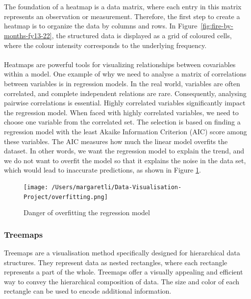 \documentclass{article}\usepackage[]{graphicx}\usepackage[]{xcolor}
\begin{document}
\\  
\\The foundation of a heatmap is a data matrix, where each entry in this matrix represents an observation or measurement. Therefore, the first step to create a heatmap is to organize the data by columns and rows. In Figure~\ref{fig:fire-by-months-fy13-22}, the structured data is displayed as a grid of coloured cells, where the colour intensity corresponds to the underlying frequency.
\\  
\\Heatmaps are powerful tools for visualizing relationships between covariables within a model. One example of why we need to analyse a matrix of correlations between variables is in regression models. In the real world, variables are often correlated, and complete independent relations are rare. Consequently, analysing pairwise correlations is essential. Highly correlated variables significantly impact the regression model. When faced with highly correlated variables, we need to choose one variable from the correlated set. The selection is based on finding a regression model with the least Akaike Information Criterion (AIC) score among these variables. The AIC measures how much the linear model overfits the dataset. In other words, we want the regression model to explain the trend, and we do not want to overfit the model so that it explains the noise in the data set, which would lead to inaccurate predictions, as shown in Figure \ref{fig:noisy}.


\begin{figure}[h]
    \centering
    \texttt{[image: /Users/margaretli/Data-Visualisation-Project/overfitting.png]}
    \caption{Danger of overfitting the regression model}
    \label{fig:noisy}
\end{figure}

\subsubsection{Treemaps}
Treemaps are a visualisation method specifically designed for hierarchical data structures. They represent data as nested rectangles, where each rectangle represents a part of the whole. Treemaps offer a visually appealing and efficient way to convey the hierarchical composition of data. The size and color of each rectangle can be used to encode additional information.
\end{document}

